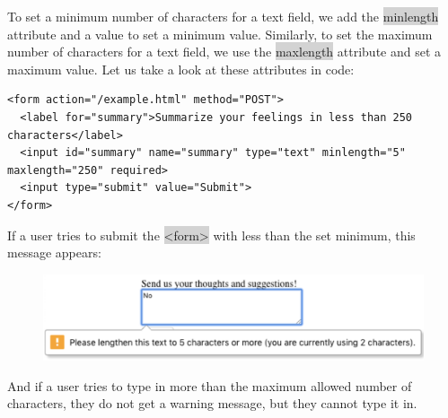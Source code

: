 \documentclass[11pt]{article}
\begin{document}
To set a minimum number of characters for a text field, we add the \colorbox{lightgray}{minlength} attribute and a value to set a minimum value. Similarly, to set the maximum number of characters for a text field, we use the \colorbox{lightgray}{maxlength} attribute and set a maximum value. Let us take a look at these attributes in code:
\begin{lstlisting}
<form action="/example.html" method="POST">
  <label for="summary">Summarize your feelings in less than 250 characters</label>
  <input id="summary" name="summary" type="text" minlength="5" maxlength="250" required>
  <input type="submit" value="Submit">
</form>
\end{lstlisting}
If a user tries to submit the \colorbox{lightgray}{<form>} with less than the set minimum, this message appears:
\begin{figure}[H]
\includegraphics[scale = 0.75]{5_3}
\centering
\end{figure}
\vspace{-4mm}

And if a user tries to type in more than the maximum allowed number of characters, they do not get a warning message, but they cannot type it in. 
\end{document}
